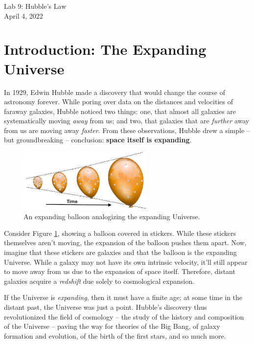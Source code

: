 \documentclass[11pt]{article}
\begin{document}
\begin{center}
\huge{Lab 9: Hubble's Law}\\ \medskip \Large{April 4, 2022}
\end{center}

\section{Introduction: The Expanding Universe}
In 1929, Edwin Hubble made a discovery that would change the course of astronomy forever. While poring over data on the distances and velocities of faraway galaxies, Hubble noticed two things: one, that almost all galaxies are systematically moving \emph{away} from us; and two, that galaxies that are \emph{further} away from us are moving away \emph{faster}. From these observations, Hubble drew a simple -- but groundbreaking -- conclusion: \textbf{space itself is expanding}.  

\begin{figure}[h!]
    \centering
    \includegraphics[width=0.6\textwidth]{Images/expanding balloon.jpg}
    \caption{An expanding balloon analogizing the expanding Universe.}
    \label{fig:balloon}
\end{figure}
\noindent
Consider Figure \ref{fig:balloon}, showing a balloon covered in stickers. While these stickers themselves aren't moving, the expansion of the balloon pushes them apart. Now, imagine that these stickers are galaxies and that the balloon is the expanding Universe. While a galaxy may not have its own intrinsic velocity, it'll still appear to move away from us due to the expansion of space itself. Therefore, distant galaxies acquire a \emph{redshift} due solely to cosmological expansion.

\medskip \noindent
If the Universe is \emph{expanding}, then it must have a finite age; at some time in the distant past, the Universe was just a point. Hubble's discovery thus revolutionized the field of cosmology -- the study of the history and composition of the Universe -- paving the way for theories of the Big Bang, of galaxy formation and evolution, of the birth of the first stars, and so much more.
\end{document}
